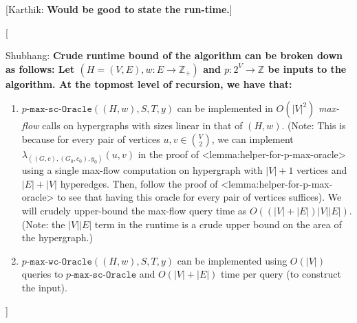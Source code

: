 \documentclass{article}
\def\Cref#1{<#1>}%
\newcommand{\functionMaximizationOracle}[1]{\ensuremath{{#1}\text{-}\mathtt{max}\text{-}\mathtt{wc}\text{-}\mathtt{Oracle}}\xspace}
\newcommand{\functionMaximizationOracleStrongCover}[1]{\ensuremath{{#1}\text{-}\mathtt{max}\text{-}\mathtt{sc}\text{-}\mathtt{Oracle}}\xspace}
\newcommand{\shubhang}[1]{{\color{blue}[{\tiny Shubhang: \bf #1}]\marginpar{\color{blue}*}}}
\newcommand{\knote}[1]{{\color{red}[{\tiny Karthik: \bf #1}]\marginpar{\color{red}*}}}
\providecommand{\Z}{\mathbb{Z}}
\begin{document}
\iffalse
\knote{Would be good to state the run-time.}
\shubhang{Crude runtime bound of the algorithm can be broken down as follows: Let $(H = (V, E),w:E\rightarrow\Z_+)$ and $p:2^V\rightarrow\Z$ be inputs to the algorithm. At the topmost level of recursion, we have that:
\begin{enumerate}
    \item $\functionMaximizationOracleStrongCover{p}((H,w), S, T , y)$ can be implemented in $O(|V|^2)$ \emph{max-flow} calls on hypergraphs with sizes linear in that of $(H,w)$. (Note: This is because for every pair of vertices $u,v \in {V\choose 2}$, we can implement $\lambda_{((G, c), (G_0, c_0), y_0)}(u, v)$ in the proof of \Cref{lemma:helper-for-p-max-oracle} using a single max-flow computation on hypergraph with $|V|+1$ vertices and $|E| + |V|$ hyperedges. Then, follow the proof of \Cref{lemma:helper-for-p-max-oracle} to see that having this oracle for every pair of vertices suffices). We will crudely upper-bound the max-flow query time as $O((|V|+|E|)|V||E|)$.
    (Note: the $|V||E|$ term in the runtime is a crude upper bound on the area of the hypergraph.)
    \item $\functionMaximizationOracle{p}((H,w), S, T, y)$ can be implemented using $O(|V|)$ queries to $\functionMaximizationOracleStrongCover{p}$ and $O(|V| + |E|)$ time per query (to construct the input). 
    \end{enumerate}
    
}
\end{document}

